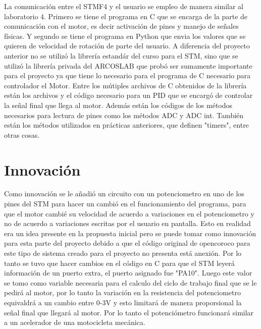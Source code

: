 \documentclass[letterpaper]{article}
\begin{document}
La comunicación entre el STMF4 y el usuario se empleo de manera similar al laboratorio 4. Primero se tiene el programa en C que se encarga de la parte de comunicación
con el motor, es decir activación de pines y manejo de señales físicas. Y segundo se tiene el programa en Python que envia los valores que se quieren de velocidad de rotación de parte del usuario.
A diferencia del proyecto anterior no se utilizó la librería estandár del curso para el STM, sino que se utilizó la librería privada del ARCOSLAB que probó ser sumamente importante para el proyecto ya
que tiene lo necesario para el programa de C necesario para controlador el Motor. 
Entre los mútiples archivos de C obtenidos de la librería están los archivos y el código necesario para un PID que se encargó
de controlar la señal final que llega al motor. Además están los códigos de los métodos necesarios para lectura de pines como los métodos ADC y ADC int. También están los métodos utilizados en prácticas
anteriores, que definen "timers", entre otras cosas.

 
 

\section{Innovación}
Como innovación se le añadió un circuito con un potenciometro en uno de los pines del STM para hacer un cambió en el funcionamiento del programa, para que el motor cambié su velocidad 
de acuerdo a variaciones en el potenciometro y no de acuerdo a variaciones escritas por el usuario en pantalla. Esto en realidad era un idea presente en la propuesta inicial pero se puede tomar como innovación
para esta parte del proyecto debido a que el código original de opencoroco para este tipo de sistema creado para el proyecto no presenta está anexión. Por lo tanto se tuvo que hacer cambios en el código en C
para que el STM leyerá información de un puerto extra, el puerto asignado fue "PA10". Luego este valor se tomo como variable necesaria para el calculo del ciclo de trabajo final que se le pedirá al motor, por lo tanto
la variación en la resistencia del potenciometro equivaldrá a un cambio entre 0-3V y esto limitará de manera proporsional la señal final que llegará al motor. Por lo tanto el potenciómetro funcionará 
similar a un acelerador de una motocicleta mecánica.
\end{document}
